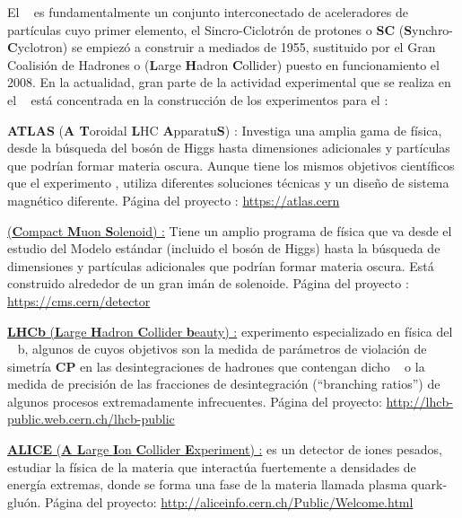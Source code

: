 El \CERN ~ es fundamentalmente un conjunto interconectado de aceleradores de partículas cuyo primer elemento, el Sincro-Ciclotrón de protones o \textbf{SC} (\textbf{S}ynchro-\textbf{C}yclotron) se empiezó a construir a mediados de 1955, sustituido por el Gran Coalisión de Hadrones  o \LHC (\textbf{L}arge \textbf{H}adron \textbf{C}ollider) puesto en funcionamiento el 2008. En la actualidad, gran parte de la actividad experimental que se realiza en el \CERN ~ está concentrada en la construcción de los experimentos para el \LHC:
\begin{itemize_f}
\item \textbf{ATLAS} (\textbf{A T}oroidal \textbf{L}HC \textbf{A}pparatu\textbf{S}) : Investiga una amplia gama de física, desde la búsqueda del bosón de Higgs hasta dimensiones adicionales y partículas que podrían formar materia oscura. Aunque tiene los mismos objetivos científicos que el experimento \CMS, utiliza diferentes soluciones técnicas y un diseño de sistema magnético diferente. Página del proyecto : \href{https://atlas.cern}{https://\-atlas\-.\-cern}%

\item \CMS \href{https://en.wikipedia.org/wiki/Compact_Muon_Solenoid}{(\textbf{C}ompact \textbf{M}uon \textbf{S}olenoid) :} Tiene un amplio programa de física que va desde el estudio del Modelo estándar (incluido el bosón de Higgs) hasta la búsqueda de dimensiones y partículas adicionales que podrían formar materia oscura. Está construido alrededor de un gran imán de solenoide. Página del proyecto : \href{https://cms.cern/detector}{https://\-cms.\-cern/\-de\-tec\-tor}%

\item \href{https://es.wikipedia.org/wiki/LHCb}{\textbf{LHCb} (\textbf{L}arge \textbf{H}adron \textbf{C}ollider \textbf{b}eauty) :} experimento especializado en física del \quark ~ b, algunos de cuyos objetivos son la medida de parámetros de violación de simetría \textbf{CP} en las desintegraciones de hadrones que contengan dicho \quark ~ o la medida de precisión de las fracciones de desintegración (``branching ratios'') de algunos procesos extremadamente infrecuentes. Página del proyecto: \href{http://lhcb-public.web.cern.ch/lhcb-public}{http://lhcb-\-public.\-web.\-cern.\-ch/\-lhcb-\-public}

\item \href{https://en.wikipedia.org/wiki/ALICE_experiment}{\textbf{ALICE} (\textbf{A L}arge \textbf{I}on \textbf{C}ollider \textbf{E}xperiment) :} es un detector de iones pesados, estudiar la física de la materia que interactúa fuertemente a densidades de energía extremas, donde se forma una fase de la materia llamada plasma quark-gluón. Página del proyecto: \href{http://aliceinfo.cern.ch/Public/Welcome.html}{http://aliceinfo\-.cern\-.ch/\-Public/\-Welcome\-.html}


\end{itemize_f}
